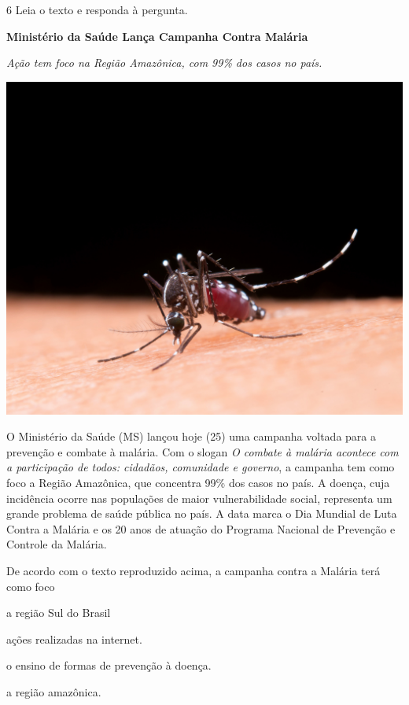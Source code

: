 \pagebreak
\num{6} Leia o texto e responda à pergunta.

\begin{myquote}
\textbf{Ministério da Saúde Lança Campanha Contra Malária}

\textit{Ação tem foco na Região Amazônica, com 99\% dos casos no país.}

\begin{center}
\includegraphics[width=.5\textwidth]{media/image41.jpg}
\end{center}

O Ministério da Saúde (MS) lançou hoje (25) uma campanha voltada para a
prevenção e combate à malária. Com o slogan \textit{O combate à malária acontece
com a participação de todos: cidadãos, comunidade e governo}, a campanha
tem como foco a Região Amazônica, que concentra 99\% dos casos no país. A
doença, cuja incidência ocorre nas populações de maior vulnerabilidade
social, representa um grande problema de saúde pública no país. A data
marca o Dia Mundial de Luta Contra a Malária e os 20 anos de atuação do
Programa Nacional de Prevenção e Controle da Malária.

\end{myquote}

De acordo com o texto reproduzido acima, a campanha contra a Malária
terá como foco

\begin{escolha}
  \item a região Sul do Brasil

  \item ações realizadas na internet.

  \item o ensino de formas de prevenção à doença.

  \item a região amazônica.
\end{escolha}

